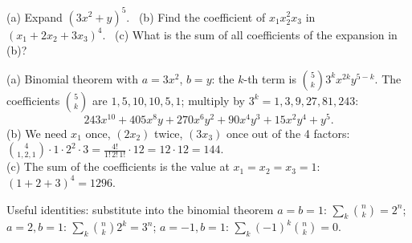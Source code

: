
\begin{problem}
	(a) Expand $(3x^2+y)^5$. \
	(b) Find the coefficient of $x_1x_2^2x_3$ in $(x_1+2x_2+3x_3)^4$. \
	(c) What is the sum of all coefficients of the expansion in (b)?
\end{problem}

\begin{slides}
	\small
	\exstatement
	\pause
	\sol
	(a) Binomial theorem with $a=3x^2$, $b=y$: the $k$-th term is
	$\binom5k3^kx^{2k}y^{5-k}$. The coefficients $\binom5k$ are
	$1,5,10,10,5,1$; multiply by $3^k=1,3,9,27,81,243$:
	\[ 243x^{10}+405x^8y+270x^6y^2+90x^4y^3+15x^2y^4+y^5. \]
	(b) We need $x_1$ once, $(2x_2)$ twice, $(3x_3)$ once out of the 4 factors:
	$\binom{4}{1,2,1}\cdot 1\cdot 2^2\cdot 3 = \frac{4!}{1!\,2!\,1!}\cdot 12
		= 12\cdot 12 = 144$.\\[1mm]
	(c) The sum of the coefficients is the value at $x_1=x_2=x_3=1$:
	$(1+2+3)^4 = 1296$.
	\pause
	\begin{alertblock}{Useful identities: substitute into the binomial theorem}
		$a=b=1$: $\sum_k\binom nk = 2^n$; \quad $a=2,b=1$:
		$\sum_k\binom nk 2^k = 3^n$; \quad $a=-1,b=1$:
		$\sum_k(-1)^k\binom nk = 0$.
	\end{alertblock}
\end{slides}

